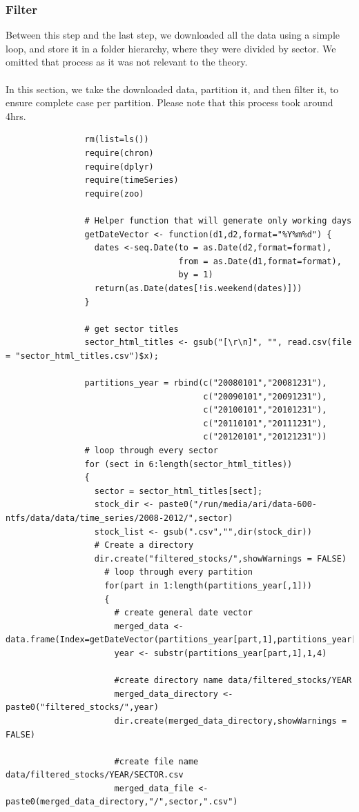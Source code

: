 \documentclass[12pt,titlepage,letter]{article}
\begin{document}
		\subsubsection{Filter}
			Between this step and the last step, we downloaded all the data using a simple loop, and store it in a folder hierarchy, where they were divided by sector. We omitted that process as it was not relevant to the theory. \\
			\\
			In this section, we take the downloaded data, partition it, and then filter it, to ensure complete case per partition. Please note that this process took around 4hrs.
			\begin{lstlisting}
				rm(list=ls())
				require(chron)
				require(dplyr)
				require(timeSeries)
				require(zoo)

				# Helper function that will generate only working days
				getDateVector <- function(d1,d2,format="%Y%m%d") {
				  dates <-seq.Date(to = as.Date(d2,format=format),
				                   from = as.Date(d1,format=format),
				                   by = 1)
				  return(as.Date(dates[!is.weekend(dates)]))
				}

				# get sector titles
				sector_html_titles <- gsub("[\r\n]", "", read.csv(file = "sector_html_titles.csv")$x);

				partitions_year = rbind(c("20080101","20081231"),
				                        c("20090101","20091231"),
				                        c("20100101","20101231"),
				                        c("20110101","20111231"),
				                        c("20120101","20121231"))
				# loop through every sector
				for (sect in 6:length(sector_html_titles))
				{
				  sector = sector_html_titles[sect];
				  stock_dir <- paste0("/run/media/ari/data-600-ntfs/data/data/time_series/2008-2012/",sector)
				  stock_list <- gsub(".csv","",dir(stock_dir))
				  # Create a directory
				  dir.create("filtered_stocks/",showWarnings = FALSE)
				    # loop through every partition
				    for(part in 1:length(partitions_year[,1]))
				    {
				      # create general date vector
				      merged_data <- data.frame(Index=getDateVector(partitions_year[part,1],partitions_year[part,2]))
				      year <- substr(partitions_year[part,1],1,4)
				      
				      #create directory name data/filtered_stocks/YEAR
				      merged_data_directory <- paste0("filtered_stocks/",year)
				      dir.create(merged_data_directory,showWarnings = FALSE)
				      
				      #create file name data/filtered_stocks/YEAR/SECTOR.csv
				      merged_data_file <- paste0(merged_data_directory,"/",sector,".csv")
				      

\end{lstlisting}
\end{document}
